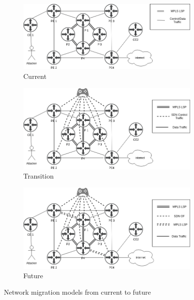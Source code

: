 

\begin{figure}[ht]
\centering
\begin{subfigure}{.33\textwidth}
\includegraphics[width=\linewidth]{resource/img/ch_background/sdn_analytics/use_case_figs/mig_step_001.png}
\caption{Current}
\label{fig:current}
\end{subfigure}%
\begin{subfigure}{.33\textwidth}
\includegraphics[width=\linewidth]{content/chapters/ch_background/sdn_analytics/2/figs/use_case_figs/mig_step_002.png}
\caption{Transition}
\label{fig:trans}
\end{subfigure}%
\begin{subfigure}{.33\textwidth}
\includegraphics[width=\linewidth]{content/chapters/ch_background/sdn_analytics/2/figs/use_case_figs/mig_step_003.png}
\caption{Future}
\label{fig:future}
\end{subfigure}%
    \caption{Network migration models from current to future}
\end{figure} 


